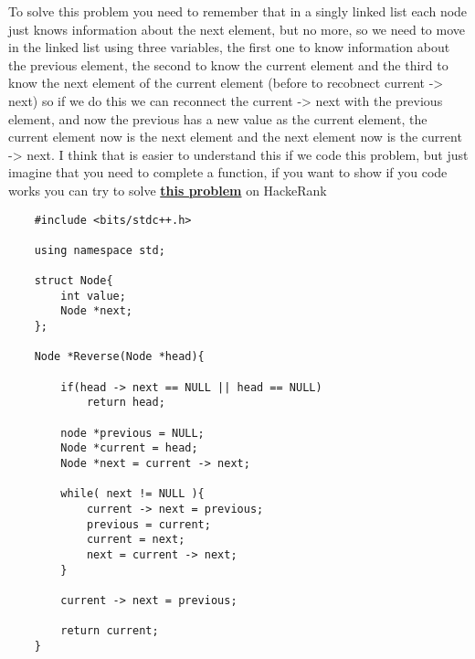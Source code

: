 To solve this problem you need to remember that in a singly linked list each node just knows information about the next element, but no more, so we need to move in the linked list using three variables, the first one to know information about the previous element, the second to know the current element and the third to know the next element of the current element (before to recobnect current -> next) so if we do this we can reconnect the current -> next with the previous element, and now the previous has a new value as the current element, the current element now is the next element and the next element now is the current -> next. I think that is easier to understand this if we code this problem, but just imagine that you need to complete a function, if you want to show if you code works you can try to solve \href{https://www.hackerrank.com/challenges/reverse-a-linked-list/problem}{\textbf{this problem}} on HackeRank 

\begin{lstlisting}
    #include <bits/stdc++.h>

    using namespace std;

    struct Node{
        int value;
        Node *next;
    };

    Node *Reverse(Node *head){

        if(head -> next == NULL || head == NULL)
            return head;
            
        node *previous = NULL;
        Node *current = head;
        Node *next = current -> next;        
        
        while( next != NULL ){
            current -> next = previous;
            previous = current;
            current = next;
            next = current -> next;
        }

        current -> next = previous;

        return current;
    }
\end{lstlisting}